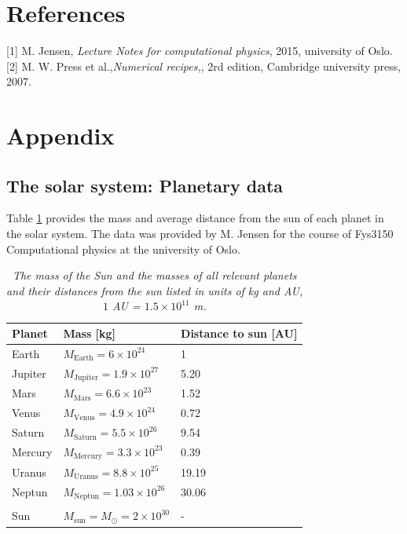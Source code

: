 \documentclass[%
reprint,nofootinbib,
amsmath,amssymb,
aps,
]{revtex4-1}
\begin{document}
\onecolumngrid

\newpage
\section{References}
[1] M. Jensen, \textit{Lecture Notes for computational physics}, 2015, university of Oslo. \\ 

[2] M. W. Press et al.,\textit{Numerical recipes,}, 2rd edition, Cambridge university press, 2007.

\vspace{0.6cm}
\section{Appendix}

\subsection{The solar system: Planetary data }\noindent 
Table \ref{pdat} provides the mass and average distance from the sun of each planet in the solar system. The data was provided by M. Jensen for the course of Fys3150 Computational physics at the university of Oslo. \vspace{5mm}  
\begin{table}[H]
	\captionsetup{width=0.52\textwidth}
	\caption{\textit{The mass of the Sun and the masses of all relevant planets and their distances from the sun listed in units of kg and AU, $1$ AU = $1.5\times 10^{11}$ m. }\label{pdat}}
	\centering
	\begin{tabular}{lll}
		\hline
		\multicolumn{1}{l}{ \textbf{Planet} } \hspace{5mm}& \multicolumn{1}{l}{\textbf{ Mass [kg]} }  \hspace{21mm}& \multicolumn{1}{l}{ \textbf{Distance to  sun [AU] }} \\
		\hline
		Earth   & $M_{\mathrm{Earth}}=6\times 10^{24}$      & 1                    \\
		Jupiter & $M_{\mathrm{Jupiter}}=1.9\times 10^{27}$  & 5.20                 \\
		Mars    & $M_{\mathrm{Mars}}=6.6\times 10^{23}$    & 1.52              \\
		Venus   & $M_{\mathrm{Venus}}=4.9\times 10^{24}$    & 0.72                 \\
		Saturn  & $M_{\mathrm{Saturn}}=5.5\times 10^{26}$  & 9.54                 \\
		Mercury & $M_{\mathrm{Mercury}}=3.3\times 10^{23}$ & 0.39                 \\
		Uranus  & $M_{\mathrm{Uranus}}=8.8\times 10^{25}$   & 19.19                \\
		Neptun  & $M_{\mathrm{Neptun}}=1.03\times 10^{26}$  & 30.06            \\ && \\ 
		Sun & $M_{\mathrm{sun}}=M_{\odot}=2\times 10^{30}$& - \\ 
		\hline
	\end{tabular}
\end{table}
\end{document}
